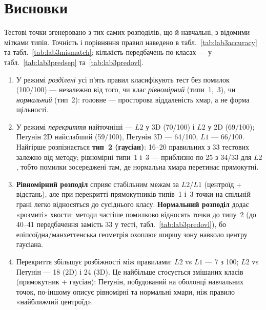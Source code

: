 \documentclass[14pt,a4paper,oneside]{extarticle}
\begin{document}
\section{Висновки}
Тестові точки згенеровано з тих самих розподілів, що й навчальні, з відомими мітками типів. Точність і порівняння правил наведено в табл.~\ref{tab:lab3accuracy} та табл.~\ref{tab:lab3mismatch}; кількість передбачень по класах --- у табл.~\ref{tab:lab3predsep} та~\ref{tab:lab3predovl}.

\begin{enumerate}
    \item У режимі \textit{розділені} усі п'ять правил класифікують тест без помилок (100/100) --- незалежно від того, чи клас \emph{рівномірний} (типи~1,~3), чи \emph{нормальний} (тип~2): головне --- просторова віддаленість хмар, а не форма щільності.
    \item У режимі \textit{перекриття} найточніші --- $L2$ у 3D (70/100) і $L2$ у 2D (69/100); Петунін 2D найслабший (59/100), Петунін 3D --- 64/100, $L1$ --- 66/100. Найгірше розпізнається \textbf{тип~2 (гаусіан)}: 16--20 правильних з 33 тестових залежно від методу; рівномірні типи~1 і~3 --- приблизно по 25 з 34/33 для $L2$, тобто помилки зосереджені там, де нормальна хмара перетинає прямокутні.
    \item \textbf{Рівномірний розподіл} сприяє стабільним межам за $L2$/$L1$ (центроїд + відстань), але при перекритті прямокутників типів~1 і~3 точки на спільній грані легко відносяться до сусіднього класу. \textbf{Нормальний розподіл} додає «розмиті» хвости: методи частіше помилково відносять точки до типу~2 (до 40--41 передбачення замість 33 у тесті, табл.~\ref{tab:lab3predovl}), бо еліпсоїдна/манхеттенська геометрія охоплює ширшу зону навколо центру гаусіана.
    \item Перекриття збільшує розбіжності між правилами: $L2$ vs $L1$ --- 7 з 100; $L2$ vs Петунін --- 18 (2D) і 24 (3D). Це найбільше стосується змішаних класів (прямокутник + гаусіан): Петунін, побудований на оболонці навчальних точок, по-іншому описує рівномірні та нормальні хмари, ніж правило «найближчий центроїд».
\end{enumerate}
\end{document}
